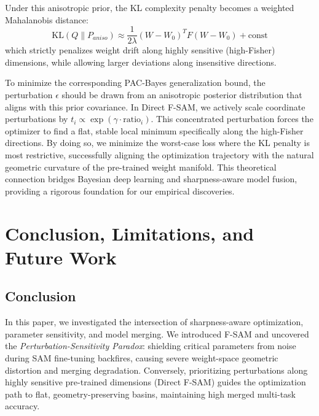 \documentclass{article}
\theoremstyle{plain}
\theoremstyle{definition}
\theoremstyle{remark}
\begin{document}
Under this anisotropic prior, the KL complexity penalty becomes a weighted Mahalanobis distance:
\begin{equation}
    \text{KL}(Q \parallel P_{aniso}) \approx \frac{1}{2\lambda} (W - W_0)^T F (W - W_0) + \text{const}
\end{equation}
which strictly penalizes weight drift along highly sensitive (high-Fisher) dimensions, while allowing larger deviations along insensitive directions.

To minimize the corresponding PAC-Bayes generalization bound, the perturbation $\epsilon$ should be drawn from an anisotropic posterior distribution that aligns with this prior covariance. In Direct F-SAM, we actively scale coordinate perturbations by $t_i \propto \exp(\gamma \cdot \text{ratio}_i)$. This concentrated perturbation forces the optimizer to find a flat, stable local minimum specifically along the high-Fisher directions. By doing so, we minimize the worst-case loss where the KL penalty is most restrictive, successfully aligning the optimization trajectory with the natural geometric curvature of the pre-trained weight manifold. This theoretical connection bridges Bayesian deep learning and sharpness-aware model fusion, providing a rigorous foundation for our empirical discoveries.

\section{Conclusion, Limitations, and Future Work}
\label{sec:conclusion}

\subsection{Conclusion}
In this paper, we investigated the intersection of sharpness-aware optimization, parameter sensitivity, and model merging. We introduced F-SAM and uncovered the \textit{Perturbation-Sensitivity Paradox}: shielding critical parameters from noise during SAM fine-tuning backfires, causing severe weight-space geometric distortion and merging degradation. Conversely, prioritizing perturbations along highly sensitive pre-trained dimensions (Direct F-SAM) guides the optimization path to flat, geometry-preserving basins, maintaining high merged multi-task accuracy.
\end{document}
